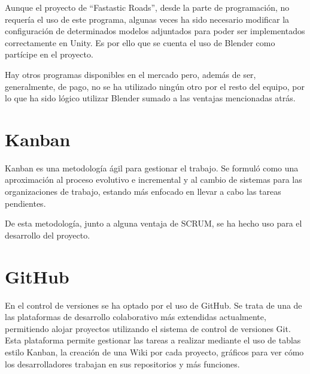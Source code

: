 Aunque el proyecto de ``Fastastic Roads'', desde la parte de programación, no requería el uso de este programa, algunas veces ha sido necesario modificar la configuración de determinados modelos adjuntados para poder ser implementados correctamente en Unity. Es por ello que se cuenta el uso de Blender como partícipe en el proyecto.

Hay otros programas disponibles en el mercado pero, además de ser, generalmente, de pago, no se ha utilizado ningún otro por el resto del equipo, por lo que ha sido lógico utilizar Blender sumado a las ventajas mencionadas atrás.

\section{Kanban}

Kanban es una metodología ágil para gestionar el trabajo. Se formuló como una aproximación al proceso evolutivo e incremental y al cambio de sistemas para las organizaciones de trabajo, estando más enfocado en llevar a cabo las tareas pendientes.

De esta metodología, junto a alguna ventaja de SCRUM, se ha hecho uso para el desarrollo del proyecto.

\section{GitHub}

En el control de versiones se ha optado por el uso de GitHub. Se trata de una de las plataformas de desarrollo colaborativo más extendidas actualmente, permitiendo alojar proyectos utilizando el sistema de control de versiones Git. Esta plataforma permite gestionar las tareas a realizar mediante el uso de tablas estilo Kanban, la creación de una Wiki por cada proyecto, gráficos para ver cómo los desarrolladores trabajan en sus repositorios y más funciones.
